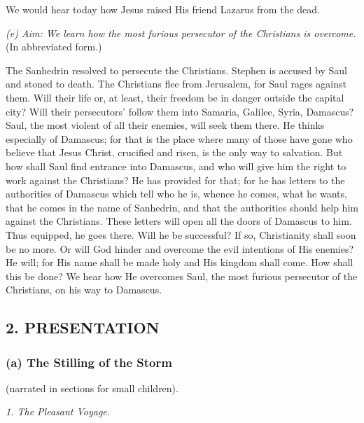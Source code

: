 We would hear today how Jesus raised His friend Lazarus from the dead.

\emph{(e) Aim: We learn how the most furious persecutor of the Christians is overcome.} (In abbreviated form.)

The Sanhedrin resolved to persecute the Christians. Stephen is accused by Saul and stoned to death. The Christians flee from Jerusalem, for Saul rages against them. Will their life or, at least, their freedom be in danger outside the capital city? Will their persecutors’ follow them into Samaria, Galilee, Syria, Damascus? Saul, the most violent of all their enemies, will seek them there. He thinks especially of Damascus; for that is the place where many of those have gone who believe that Jesus Christ, crucified and risen, is the only way to salvation. But how shall Saul find entrance into Damascus, and who will give him the right to work against the Christians? He has provided for that; for he has letters to the authorities of Damascus which tell who he is, whence he comes, what he wants, that he comes in the name of Sanhedrin, and that the authorities should help him against the Christians. These letters will open all the doors of Damascus to him. Thus equipped, he goes there. Will he be successful? If so, Christianity shall soon be no more. Or will God hinder and overcome the evil intentions of His enemies? He will; for His name shall be made holy and His kingdom shall come. How shall this be done? We hear how He overcomes Saul, the most furious persecutor of the Christians, on his way to Damascus.

\subsection{2. PRESENTATION}

\subsubsection{(a) The Stilling of the Storm} (narrated in sections for small children).

\emph{1. The Pleasant Voyage.}

